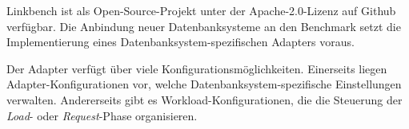 Linkbench ist als Open-Source-Projekt unter der Apache-2.0-Lizenz auf Github verfügbar. Die Anbindung neuer Datenbanksysteme an den Benchmark setzt die Implementierung eines Datenbanksystem-spezifischen Adapters voraus. 

Der Adapter verfügt über viele Konfigurationsmöglichkeiten. Einerseits liegen Adapter-Konfigurationen vor, welche Datenbanksystem-spezifische Einstellungen verwalten. Andererseits gibt es Workload-Konfigurationen, die die Steuerung der \textit{Load}- oder \textit{Request}-Phase organisieren. 